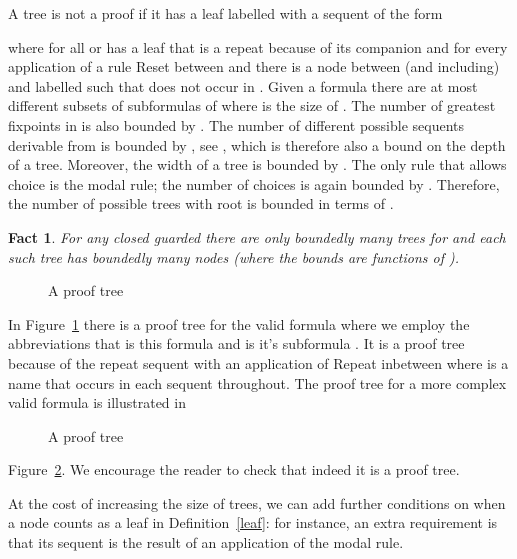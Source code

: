 \documentclass[copyright,creativecommons]{eptcs}
\renewcommand{\ni}{\noindent}
\newtheorem{fact}[prop]{Fact}
\begin{document}
\ni
A tree is not a proof if it has a leaf labelled with a
sequent of the form 

where  for all  or has a leaf  that is a repeat
because of its companion    and for every application of a rule 
Reset between  and  there is a node  between (and including) 
 and  labelled  such that  does not occur in . 
Given a formula  there are at most  different subsets
of subformulas of  where  is the size of .
The number of greatest fixpoints in  is also bounded by .
The number of different possible sequents derivable from 
is bounded by , see \cite{Ju09}, which is therefore
also a bound on the depth of a tree.  Moreover, the width of  a tree
is bounded by .  The only rule that allows choice is the modal rule;
the number of choices is again bounded by . 
Therefore, the  number of possible trees with root  is 
bounded in terms of . 

\begin{fact}
\label{finitefact}
For any closed guarded  there are only boundedly  many 
trees
for  and each such tree has boundedly many nodes (where the bounds
are functions  of ).
\end{fact}
 
\begin{figure}



\caption{A proof tree} 
\label{fig6}
\end{figure}
In Figure~\ref{fig6} there is a proof tree for the valid formula
 where we employ the abbreviations
that  is this formula and  is it's subformula 
.
It is a  proof tree because of the repeat sequent 
 with an application of Repeat inbetween
where  is a name that occurs in each sequent throughout. 
The proof tree for a  more complex  valid formula  is 
illustrated in 
\begin{figure}







\caption{A proof tree} 
\label{fig7}
\end{figure}
Figure~\ref{fig7}. We encourage the reader to check that indeed
it is a  proof tree.

At the  cost of increasing the size of trees, 
we can add further  conditions on  when a node  counts
as a leaf in   Definition~\ref{leaf}: for instance, an extra
requirement is that  its sequent
is  the result of an 
application of the modal rule. 
\end{document}
